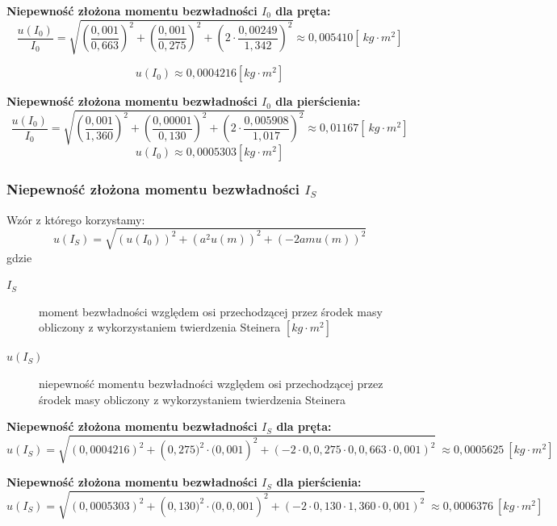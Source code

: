 \documentclass[a4paper,11pt]{article}
\begin{document}
\textbf{Niepewność złożona momentu bezwładności $I_{0}$ dla pręta:}
\begin{equation}
\frac{u(I_{0})}{I_{0}}=\sqrt{\left(\frac{0,001}{0,663}\right) ^2+\left( \frac{0,001}{0,275}\right)^2+\left(2 \cdot \frac{0,00249}{1,342}\right)^2} \approx 0,005410 [~kg\cdot m^2]
\end{equation}

$$ u(I_{0}) \approx 0,0004216 \left[ kg \cdot m^2 \right]$$

\textbf{Niepewność złożona momentu bezwładności $I_{0}$ dla pierścienia:}
\begin{equation}
\frac{u(I_{0})}{I_{0}}=\sqrt{\left(\frac{0,001}{1,360}\right) ^2+\left( \frac{0,00001}{0,130}\right)^2+\left(2 \cdot \frac{0,005908}{1,017}\right)^2} \approx 0,01167 [~kg\cdot m^2]
\end{equation}
$$ u(I_{0}) \approx 0,0005303 \left[ kg \cdot m^2 \right]$$
\subsubsection{Niepewność złożona momentu bezwładności $I_{S}$}
Wzór z którego korzystamy:
\begin{equation}
u(I_{S})=\sqrt{\left( u(I_{0})\right)^2+\left(a^2u(m) \right)^2+\left( -2amu(m)\right)^2}
\end{equation}
gdzie
\begin{description}
\item [$I_{S}$]  moment bezwładności względem osi przechodzącej przez środek masy obliczony z wykorzystaniem twierdzenia Steinera $\left[kg \cdot m^{2} \right]$
\item [$ u(I_{S})$] niepewność momentu bezwładności względem osi przechodzącej przez środek masy obliczony z wykorzystaniem twierdzenia Steinera

\end{description}

\textbf{Niepewność złożona momentu bezwładności $I_{S}$ dla pręta:}
\begin{equation}
u(I_{S})=\sqrt{\left( 0,0004216\right)^2+\left(0,275)^2\cdot (0,001 \right)^2+\left( -2\cdot 0,0,275\cdot 0,0,663\cdot 0,001\right)^2}~\approx 0,0005625 ~[kg\cdot m^2]
\end{equation}

\textbf{Niepewność złożona momentu bezwładności $I_{S}$ dla pierścienia:}
\begin{equation}
u(I_{S})=\sqrt{\left( 0,0005303 \right)^2+\left(0,130)^2\cdot (0,0,001 \right)^2+\left( -2\cdot 0,130\cdot 1,360\cdot 0,001 \right)^2}~ \approx 0,0006376 ~ [kg\cdot m^2]
\end{equation}
\end{document}
